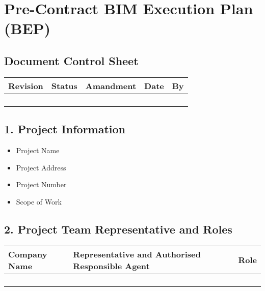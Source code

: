 \documentclass[
]{book}
\author{}
\date{}
\providecommand{\tightlist}{%
  \setlength{\itemsep}{0pt}\setlength{\parskip}{0pt}}
\begin{document}
\frontmatter

\mainmatter
\hypertarget{pre-contract-bim-execution-plan-bep}{%
\section{Pre-Contract BIM Execution Plan (BEP)}\label{pre-contract-bim-execution-plan-bep}}

\hypertarget{document-control-sheet}{%
\subsection{Document Control Sheet}\label{document-control-sheet}}

\begin{longtable}[]{@{}lllll@{}}
\toprule()
Revision & Status & Amandment & Date & By \\
\midrule()
\endhead
& & & & \\
& & & & \\
& & & & \\
& & & & \\
\bottomrule()
\end{longtable}

\hypertarget{project-information}{%
\subsection{1. Project Information}\label{project-information}}

\begin{itemize}
\tightlist
\item
  Project Name
\item
  Project Address
\item
  Project Number
\item
  Scope of Work
\end{itemize}

\hypertarget{project-team-representative-and-roles}{%
\subsection{2. Project Team Representative and Roles}\label{project-team-representative-and-roles}}

\begin{longtable}[]{@{}lll@{}}
\toprule()
Company Name & Representative and Authorised Responsible Agent & Role \\
\midrule()
\endhead
& & \\
& & \\
& & \\
& & \\
\bottomrule()
\end{longtable}
\end{document}
